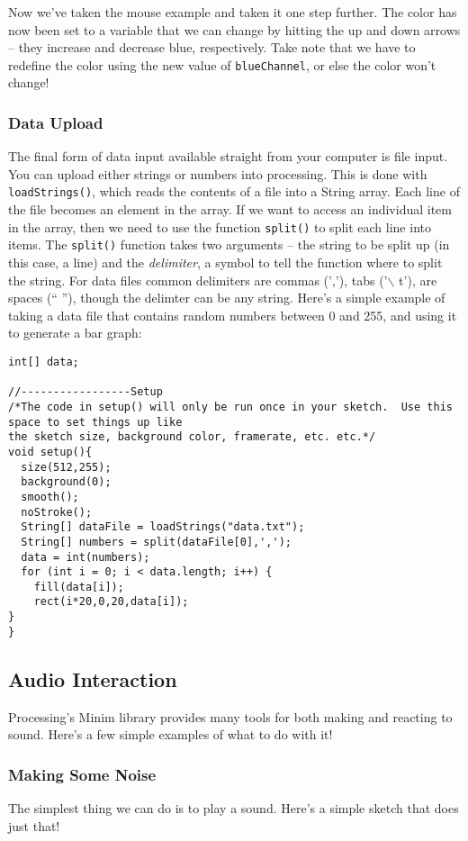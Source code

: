 Now we've taken the mouse example and taken it one step further.  The color has now been set to a variable that we can change by hitting the up and down arrows -- they increase and decrease blue, respectively.  Take note that we have to redefine the color using the new value of \texttt{blueChannel}, or else the color won't change!

\subsubsection{Data Upload}
The final form of data input available straight from your computer is file input.  You can upload either strings or numbers into processing.  This is done with \texttt{loadStrings()}, which reads the contents of a file into a String array.  Each line of the file becomes an element in the array.  If we want to access an individual item in the array, then we need to use the function \texttt{split()} to split each line into items.  The \texttt{split()} function takes two arguments -- the string to be split up (in this case, a line) and the \emph{delimiter}, a symbol to tell the function where to split the string.  For data files common delimiters are commas (','), tabs ('$\backslash$ t'), are spaces (`` ''), though the delimter can be any string.  Here's a simple example of taking a data file that contains random numbers between 0 and 255, and using it to generate a bar graph:

\begin{verbatim}
int[] data;

//-----------------Setup
/*The code in setup() will only be run once in your sketch.  Use this space to set things up like
the sketch size, background color, framerate, etc. etc.*/
void setup(){
  size(512,255);
  background(0);
  smooth();
  noStroke();
  String[] dataFile = loadStrings("data.txt");
  String[] numbers = split(dataFile[0],',');
  data = int(numbers);
  for (int i = 0; i < data.length; i++) {
    fill(data[i]);
    rect(i*20,0,20,data[i]);
}
}
\end{verbatim}

\subsection{Audio Interaction}
Processing's Minim library provides many tools for both making and reacting to sound.  Here's a few simple examples of what to do with it!
\subsubsection{Making Some Noise}
The simplest thing we can do is to play a sound.  Here's a simple sketch that does just that!

